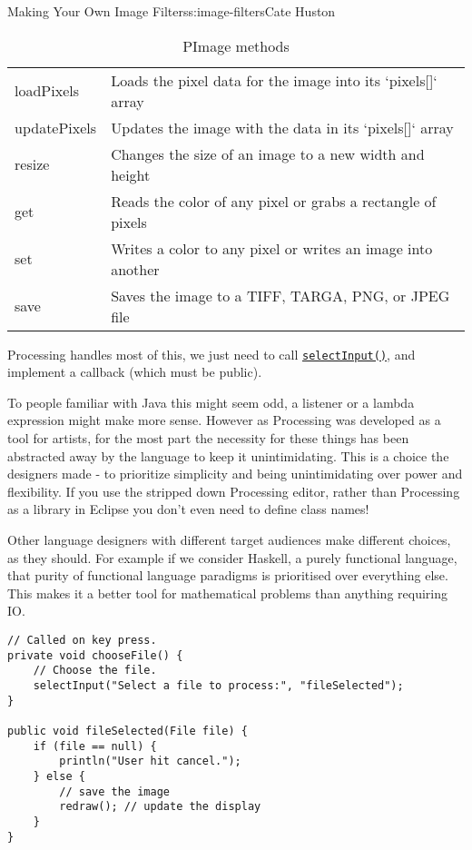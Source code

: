 \begin{aosachapter}{Making Your Own Image Filters}{s:image-filters}{Cate Huston}
\begin{table}
\centering
{\footnotesize
{}
\begin{tabular}{ll}
\hline
loadPixels & Loads the pixel data for the image into its `pixels[]` array \\
updatePixels & Updates the image with the data in its `pixels[]` array \\
resize & Changes the size of an image to a new width and height \\
get & Reads the color of any pixel or grabs a rectangle of pixels \\
set & Writes a color to any pixel or writes an image into another \\
save & Saves the image to a TIFF, TARGA, PNG, or JPEG file \\
\hline
\end{tabular}
}
\caption{PImage methods}
\label{500l.imagefilters.pimagemethods}
\end{table}

\label{file-chooser}

Processing handles most of this, we just need to call
\href{http://www.processing.org/reference/selectInput_.html}{\texttt{selectInput()}},
and implement a callback (which must be public).

To people familiar with Java this might seem odd, a listener or a lambda
expression might make more sense. However as Processing was developed as
a tool for artists, for the most part the necessity for these things has
been abstracted away by the language to keep it unintimidating. This is
a choice the designers made - to prioritize simplicity and being
unintimidating over power and flexibility. If you use the stripped down
Processing editor, rather than Processing as a library in Eclipse you
don't even need to define class names!

Other language designers with different target audiences make different
choices, as they should. For example if we consider Haskell, a purely
functional language, that purity of functional language paradigms is
prioritised over everything else. This makes it a better tool for
mathematical problems than anything requiring IO.

\begin{verbatim}
// Called on key press.
private void chooseFile() {
    // Choose the file.
    selectInput("Select a file to process:", "fileSelected");
}

public void fileSelected(File file) {
    if (file == null) {
        println("User hit cancel.");
    } else {
        // save the image
        redraw(); // update the display
    }
}
\end{verbatim}


\end{aosachapter}
